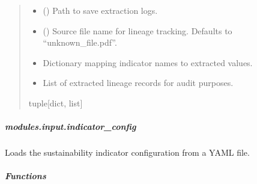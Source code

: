 \documentclass[letterpaper,10pt,english]{sphinxmanual}
\begin{document}
\begin{fulllineitems}
\begin{quote}
\begin{description}
\begin{itemize}
\item {} 
\sphinxAtStartPar
{} () \textendash{} Path to save extraction logs.

\item {} 
\sphinxAtStartPar
{} (\sphinxstyleliteralemphasis{\sphinxupquote{, }}) \textendash{} Source file name for lineage tracking. Defaults to “unknown\_file.pdf”.

\end{itemize}

\sphinxAtStartPar
\begin{itemize}
\item {} 
\sphinxAtStartPar
Dictionary mapping indicator names to extracted values.

\item {} 
\sphinxAtStartPar
List of extracted lineage records for audit purposes.

\end{itemize}


\sphinxAtStartPar
tuple{[}dict, list{]}

\end{description}\end{quote}

\end{fulllineitems}


\sphinxstepscope


\subparagraph{modules.input.indicator\_config}
\label{\detokenize{autoapi/modules/input/indicator_config/index:module-modules.input.indicator_config}}\label{\detokenize{autoapi/modules/input/indicator_config/index:modules-input-indicator-config}}\label{\detokenize{autoapi/modules/input/indicator_config/index::doc}}
\sphinxAtStartPar
Loads the sustainability indicator configuration from a YAML file.


\subparagraph{Functions}
\label{\detokenize{autoapi/modules/input/indicator_config/index:functions}}
\end{document}
